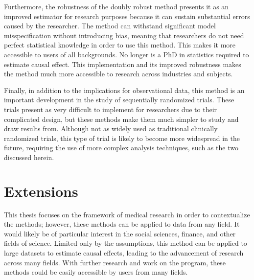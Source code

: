 Furthermore, the robustness of the doubly robust method presents it as an improved estimator for research purposes because it can sustain substantial errors caused by the researcher.  The method can withstand significant model misspecification without introducing bias, meaning that researchers do not need perfect statistical knowledge in order to use this method.  This makes it more accessible to users of all backgrounds.  No longer is a PhD in statistics required to estimate causal effect.  This implementation and its improved robustness makes the method much more accessible to research across industries and subjects.  

Finally, in addition to the implications for observational data, this method is an important development in the study of sequentially randomized trials.  These trials present as very difficult to implement for researchers due to their complicated design, but these methods make them much simpler to study and draw results from.  Although not as widely used as traditional clinically randomized trials, this type of trial is likely to become more widespread in the future, requiring the use of more complex analysis techniques, such as the two discussed herein.  

\section{Extensions}
This thesis focuses on the framework of medical research in order to contextualize the methods; however, these methods can be applied to data from any field.  It would likely be of particular interest in the social sciences, finance, and other fields of science.  Limited only by the assumptions, this method can be applied to large datasets to estimate causal effects, leading to the advancement of research across many fields.  With further research and work on the program, these methods could be easily accessible by users from many fields.  

